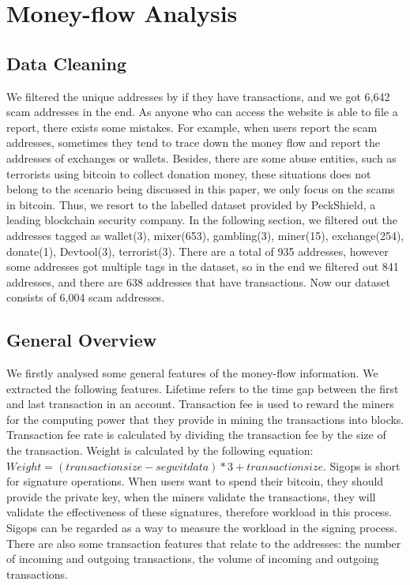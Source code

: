 \section{Money-flow Analysis}

\subsection{Data Cleaning}

We filtered the unique addresses by if they have transactions, and we got 6,642 scam addresses in the end.
 As anyone who can access the website is able to file a report, there exists some mistakes. For example, when users report the scam addresses, sometimes they tend to trace down the money flow and report the addresses of exchanges or wallets. Besides, there are some abuse entities, such as terrorists using bitcoin to collect donation money, these situations does not belong to the scenario being discussed in this paper, we only focus on the scams in bitcoin. Thus, we resort to the labelled dataset provided by PeckShield, a leading blockchain security company. In the following section, we filtered out the addresses tagged as wallet(3), mixer(653), gambling(3), miner(15), exchange(254), donate(1), Devtool(3), terrorist(3). There are a total of 935 addresses, however some addresses got multiple tags in the dataset, so in the end we filtered out 841 addresses, and there are 638 addresses that have transactions. Now our dataset consists of 6,004 scam addresses.

\subsection{General Overview}

We firstly analysed some general features of the money-flow information. We extracted the following features. Lifetime refers to the time gap between the first and last transaction in an account. Transaction fee is used to reward the miners  for the computing power that they provide in mining the transactions into blocks. Transaction fee rate is calculated by dividing the transaction fee by the size of the transaction. Weight is calculated by the following equation:
$Weight = (transaction size - segwit data) *3 + transaction size$. Sigops is short for signature operations. When users want to spend their bitcoin, they should provide the private key, when the miners validate the transactions, they will validate the effectiveness of these signatures, therefore workload in this process. Sigops can be regarded as a way to measure the workload in the signing process. There are also some transaction features that relate to the addresses: the number of incoming and outgoing transactions, the volume of incoming and outgoing transactions. 






